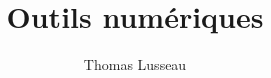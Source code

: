 \def\TLTitle{Outils numériques}
\def\TLSubtitle{Résolution des équations différentielles par le schéma d'Euler explicite}
\def\TLAuthor{Thomas Lusseau}
\def\TLInstitution{Lycée Robert Doisneau -- ATS}

\title{\TLTitle}
\author{\TLAuthor}
\date{}

\maketitle



